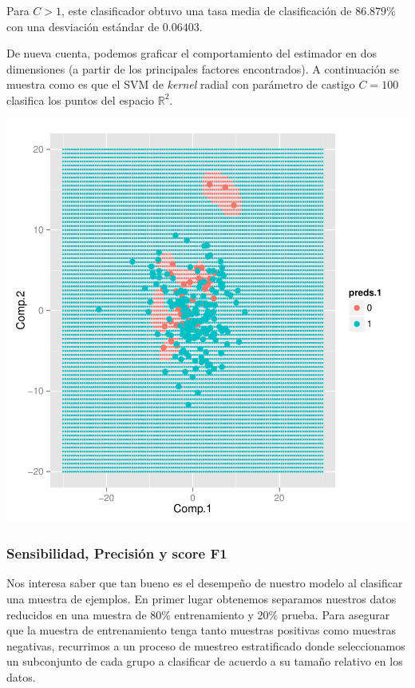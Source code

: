 \documentclass[a4paper, 10pt]{article}
\begin{document}
Para $C > 1$, este clasificador obtuvo una tasa media de clasificación de $86.879\%$ con una desviación estándar de $0.06403$. 

De nueva cuenta, podemos graficar el comportamiento del estimador en dos dimensiones (a partir de los principales factores encontrados). A continuación se muestra como es que el SVM de \emph{kernel} radial con parámetro de castigo $C = 100$ clasifica los puntos del espacio $\mathbb{R}^2$. 

\begin{Schunk}
\end{Schunk}
\includegraphics{Final-005}
\subsubsection{Sensibilidad, Precisión y score F1}
Nos interesa saber que tan bueno es el desempeño de nuestro modelo al clasificar una muestra de ejemplos. En primer lugar obtenemos separamos nuestros datos reducidos en una muestra de 80\% entrenamiento y 20\% prueba. Para asegurar que la muestra de entrenamiento tenga tanto muestras positivas como muestras negativas, recurrimos a un proceso de muestreo estratificado donde seleccionamos un subconjunto de cada grupo a clasificar de acuerdo a su tamaño relativo en los datos.
\end{document}
